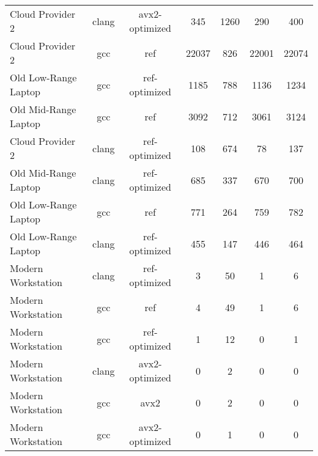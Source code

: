 \begin{table}[H]
\begin{tabularx}{\linewidth}{l c c c c c c}
            Cloud Provider 2 &                clang &       avx2-optimized &                  345 &                 1260 &                  290 &                  400\\
            Cloud Provider 2 &                  gcc &                  ref &                22037 &                  826 &                22001 &                22074\\
        Old Low-Range Laptop &                  gcc &        ref-optimized &                 1185 &                  788 &                 1136 &                 1234\\
        Old Mid-Range Laptop &                  gcc &                  ref &                 3092 &                  712 &                 3061 &                 3124\\
            Cloud Provider 2 &                clang &        ref-optimized &                  108 &                  674 &                   78 &                  137\\
        Old Mid-Range Laptop &                clang &        ref-optimized &                  685 &                  337 &                  670 &                  700\\
        Old Low-Range Laptop &                  gcc &                  ref &                  771 &                  264 &                  759 &                  782\\
        Old Low-Range Laptop &                clang &        ref-optimized &                  455 &                  147 &                  446 &                  464\\
          Modern Workstation &                clang &        ref-optimized &                    3 &                   50 &                    1 &                    6\\
          Modern Workstation &                  gcc &                  ref &                    4 &                   49 &                    1 &                    6\\
          Modern Workstation &                  gcc &        ref-optimized &                    1 &                   12 &                    0 &                    1\\
          Modern Workstation &                clang &       avx2-optimized &                    0 &                    2 &                    0 &                    0\\
          Modern Workstation &                  gcc &                 avx2 &                    0 &                    2 &                    0 &                    0\\
          Modern Workstation &                  gcc &       avx2-optimized &                    0 &                    1 &                    0 &                    0\\
        \bottomrule
    \end{tabularx}
\end{table}